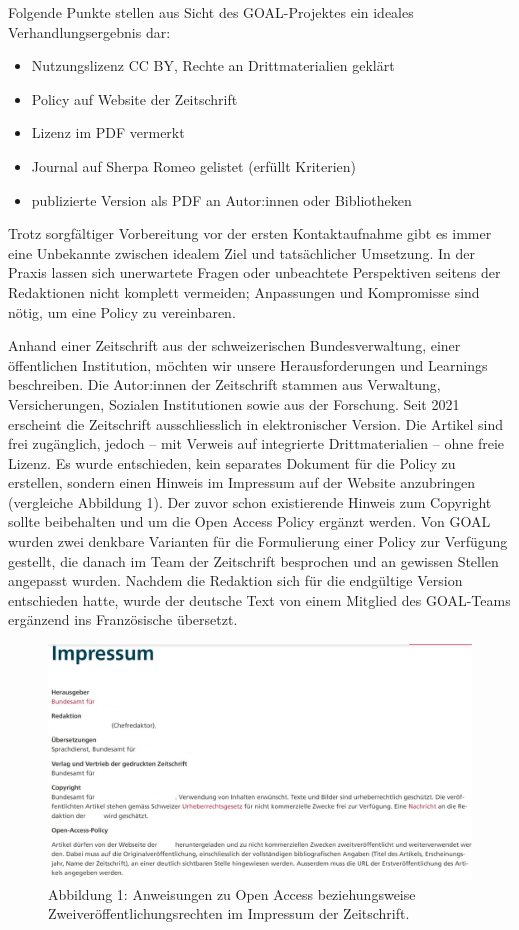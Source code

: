 \documentclass[a4paper,
fontsize=11pt,
oneside,
numbers=noperiodatend,
parskip=half-,
bibliography=totoc,
final
]{scrartcl}
\begin{document}
Folgende Punkte stellen aus Sicht des GOAL-Projektes ein ideales
Verhandlungsergebnis dar:

\begin{itemize}
\tightlist
\item
  Nutzungslizenz CC BY, Rechte an Drittmaterialien geklärt
\item
  Policy auf Website der Zeitschrift
\item
  Lizenz im PDF vermerkt
\item
  Journal auf Sherpa Romeo gelistet (erfüllt Kriterien)
\item
  publizierte Version als PDF an Autor:innen oder Bibliotheken
\end{itemize}

Trotz sorgfältiger Vorbereitung vor der ersten Kontaktaufnahme gibt es
immer eine Unbekannte zwischen idealem Ziel und tatsächlicher Umsetzung.
In der Praxis lassen sich unerwartete Fragen oder unbeachtete
Perspektiven seitens der Redaktionen nicht komplett vermeiden;
Anpassungen und Kompromisse sind nötig, um eine Policy zu vereinbaren.

Anhand einer Zeitschrift aus der schweizerischen Bundesverwaltung, einer
öffentlichen Institution, möchten wir unsere Herausforderungen und
Learnings beschreiben. Die Autor:innen der Zeitschrift stammen aus
Verwaltung, Versicherungen, Sozialen Institutionen sowie aus der
Forschung. Seit 2021 erscheint die Zeitschrift ausschliesslich in
elektronischer Version. Die Artikel sind frei zugänglich, jedoch -- mit
Verweis auf integrierte Drittmaterialien -- ohne freie Lizenz. Es wurde
entschieden, kein separates Dokument für die Policy zu erstellen,
sondern einen Hinweis im Impressum auf der Website anzubringen
(vergleiche Abbildung 1). Der zuvor schon existierende Hinweis zum
Copyright sollte beibehalten und um die Open Access Policy ergänzt
werden. Von GOAL wurden zwei denkbare Varianten für die Formulierung
einer Policy zur Verfügung gestellt, die danach im Team der Zeitschrift
besprochen und an gewissen Stellen angepasst wurden. Nachdem die
Redaktion sich für die endgültige Version entschieden hatte, wurde der
deutsche Text von einem Mitglied des GOAL-Teams ergänzend ins
Französische übersetzt.

\begin{figure}
\centering
\includegraphics{img/andres_corredera_abb1.jpg}
\caption{Abbildung 1: Anweisungen zu Open Access beziehungsweise
Zweiveröffentlichungsrechten im Impressum der Zeitschrift.}
\end{figure}
\end{document}
